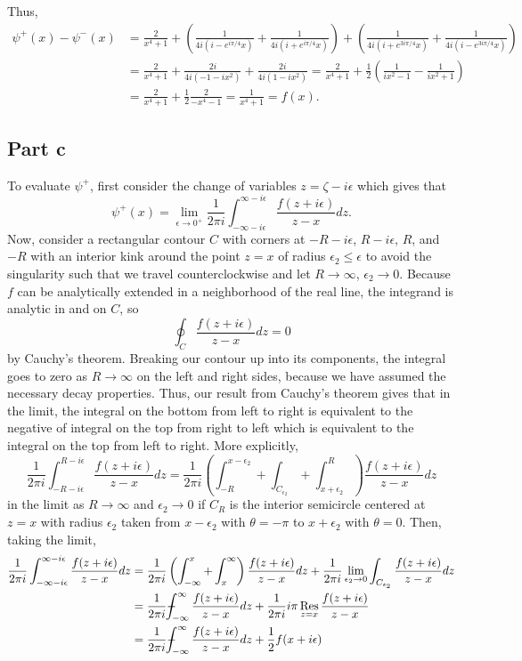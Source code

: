 \documentclass{article}
\begin{document}
Thus,
\begin{align*}
\psi^+(x)-\psi^-(x)&=\frac{2}{x^4+1}+\left(\frac{1}{4i(i-e^{i\pi/4}x)}+\frac{1}{4i(i+e^{i\pi/4}x)}\right)+\left(\frac{1}{4i(i+e^{3i\pi/4}x)}+\frac{1}{4i(i-e^{3i\pi/4}x)}\right)\\&=
\frac{2}{x^4+1}+\frac{2i}{4i(-1-ix^2)}+\frac{2i}{4i(1-ix^2)}=\frac{2}{x^4+1}+\frac{1}{2}\left(\frac{1}{ix^2-1}-\frac{1}{ix^2+1}\right)\\&=
\frac{2}{x^4+1}+\frac{1}{2}\frac{2}{-x^4-1}=\frac{1}{x^4+1}=f(x).
\end{align*}

\subsection{Part c}
To evaluate $\psi^+$, first consider the change of variables $z=\zeta-i\epsilon$ which gives that 
\[
\psi^+(x)=\lim_{\epsilon\to0^+}\frac{1}{2\pi i}\int_{-\infty-i\epsilon}^{\infty-i\epsilon}\frac{f(z+i\epsilon)}{z-x}dz.
\]
Now, consider a rectangular contour $C$ with corners at $-R-i\epsilon$, $R-i\epsilon$, $R$, and $-R$ with an interior kink around the point $z=x$ of radius $\epsilon_2\leq\epsilon$ to avoid the singularity such that we travel counterclockwise and let $R\to\infty$, $\epsilon_2\to0$. Because $f$ can be analytically extended in a neighborhood of the real line, the integrand is analytic in and on $C$, so 
\[
\oint_C\frac{f(z+i\epsilon)}{z-x}dz=0 
\]
by Cauchy's theorem. Breaking our contour up into its components, the integral goes to zero as $R\to\infty$ on the left and right sides, because we have assumed the necessary decay properties. Thus, our result from Cauchy's theorem gives that in the limit, the integral on the bottom from left to right is equivalent to the negative of integral on the top from right to left which is equivalent to the integral on the top from left to right. More explicitly,
\[
\frac{1}{2\pi i}\int_{-R-i\epsilon}^{R-i\epsilon}\frac{f(z+i\epsilon)}{z-x}dz=\frac{1}{2\pi i}\left(\int_{-R}^{x-\epsilon_2}+\int_{C_{\epsilon_2}}+\int_{x+\epsilon_2}^R\right)\frac{f(z+i\epsilon)}{z-x}dz
\]
in the limit as $R\to\infty$ and $\epsilon_2\to0$ if $C_R$ is the interior semicircle centered at $z=x$ with radius $\epsilon_2$ taken from $x-\epsilon_2$ with $\theta=-\pi$ to $x+\epsilon_2$ with $\theta=0$.
Then, taking the limit,
\begin{align*}
\frac{1}{2\pi i}\int_{-\infty-i\epsilon}^{\infty-i\epsilon}\frac{f(z+i\epsilon)}{z-x}dz&=\frac{1}{2\pi i}\left(\int_{-\infty}^{x}+\int_{x}^\infty\right)\frac{f(z+i\epsilon)}{z-x}dz+\frac{1}{2\pi i}\lim_{\epsilon_2\to0}\int_{C_{\epsilon_2}}\frac{f(z+i\epsilon)}{z-x}dz\\&=
\frac{1}{2\pi i}\pvint_{-\infty}^{\infty}\frac{f(z+i\epsilon)}{z-x}dz+\frac{1}{2\pi i}i\pi\Res_{z=x}\frac{f(z+i\epsilon)}{z-x}\\&=
\frac{1}{2\pi i}\pvint_{-\infty}^{\infty}\frac{f(z+i\epsilon)}{z-x}dz+\frac{1}{2}f(x+i\epsilon)
\end{align*}
\end{document}
